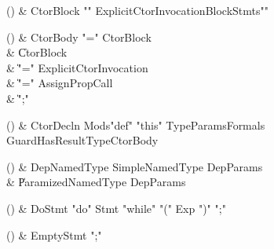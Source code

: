 \begin{bbgrammarappendix}

() & CtorBlock \label{prod:CtorBlock}  \: \xcd"{" ExplicitCtorInvocation\opt BlockStmts\opt \xcd"}"  \\


\end{bbgrammarappendix}

\begin{bbgrammarappendix}

() & CtorBody \label{prod:CtorBody}  \: \xcd"=" CtorBlock  \\

 &    \| CtorBlock \\
 &    \| \xcd"=" ExplicitCtorInvocation \\
 &    \| \xcd"=" AssignPropCall \\
 &    \| \xcd";" \\

\end{bbgrammarappendix}

\begin{bbgrammarappendix}

() & CtorDecln \label{prod:CtorDecln}  \: Mods\opt \xcd"def" \xcd"this" TypeParams\opt Formals Guard\opt HasResultType\opt CtorBody  \\


\end{bbgrammarappendix}

\begin{bbgrammarappendix}

() & DepNamedType \label{prod:DepNamedType}  \: SimpleNamedType DepParams  \\

 &    \| ParamizedNamedType DepParams \\

\end{bbgrammarappendix}

\begin{bbgrammarappendix}

() & DoStmt \label{prod:DoStmt}  \: \xcd"do" Stmt \xcd"while" \xcd"(" Exp \xcd")" \xcd";"  \\


\end{bbgrammarappendix}

\begin{bbgrammarappendix}

() & EmptyStmt \label{prod:EmptyStmt}  \: \xcd";"  \\


\end{bbgrammarappendix}

